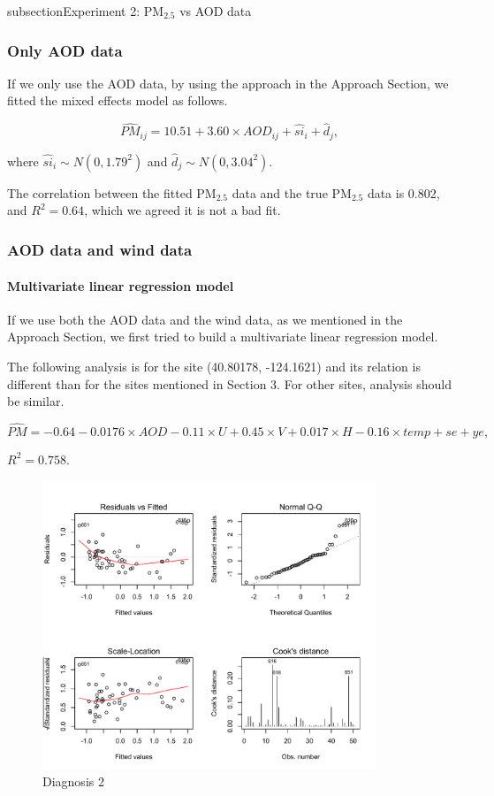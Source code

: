\documentclass[10pt]{article}
\begin{document}
subsection{Experiment 2: PM$_{2.5}$ vs AOD data}
\subsubsection{Only AOD data}
If we only use the AOD data, by using the approach in the Approach Section, we fitted the mixed effects model as follows.

$$\hat{PM}_{ij} = 10.51 + 3.60\times AOD_{ij} + \hat{si}_i + \hat{d}_j, $$

where $\hat{si}_i\sim N(0, 1.79^2)$ and $\hat{d}_j\sim N(0, 3.04^2)$. 

The correlation between the fitted PM$_{2.5}$ data and the true PM$_{2.5}$ data is 0.802, and $R^2 = 0.64$, which we agreed it is not a bad fit. 

\subsubsection{AOD data and wind data}
\paragraph{Multivariate linear regression model}

If we use both the AOD data and the wind data, as we mentioned in the Approach Section, we first tried to build a multivariate linear regression model. 

The following analysis is for the site (40.80178, -124.1621) and its  relation is different than for the sites mentioned in Section 3. For other sites, analysis should be similar. 

$$\hat{PM} = -0.64 - 0.0176\times AOD - 0.11\times U + 0.45\times V + 0.017\times H - 0.16\times temp + se + ye, $$

$R^2 = 0.758$.

\begin{figure}[H]
\centering
\includegraphics[width = 100mm]{residual.pdf}
\caption{Diagnosis 2}
\label{d1}
\end{figure}
\end{document}
